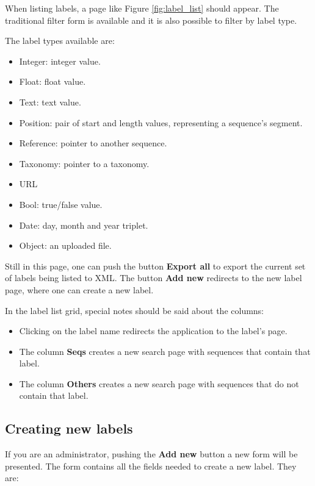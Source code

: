 When listing labels, a page like Figure \ref{fig:label_list} should appear. The traditional
filter form is available and it is also possible to filter by label type.

The label types available are:
\begin{itemize}
  \item Integer: integer value.
  \item Float: float value.
  \item Text: text value.
  \item Position: pair of start and length values, representing a sequence's segment.
  \item Reference: pointer to another sequence.
  \item Taxonomy: pointer to a taxonomy.
  \item URL
  \item Bool: true/false value.
  \item Date: day, month and year triplet.
  \item Object: an uploaded file.
\end{itemize}

Still in this page, one can push the button \textbf{Export all} to export the current set of
labels being listed to XML. The button \textbf{Add new} redirects to the new label page, where one can
create a new label.

In the label list grid, special notes should be said about the columns:

\begin{itemize}
  \item Clicking on the label name redirects the application to the label's page.
  \item The column \textbf{Seqs} creates a new search page with sequences that contain that label.
  \item The column \textbf{Others} creates a new search page with sequences that do not contain that label.
\end{itemize}

\subsection{Creating new labels}

If you are an administrator, pushing the \textbf{Add new} button a new form will be presented.
The form contains all the fields needed to create a new label. They are:

